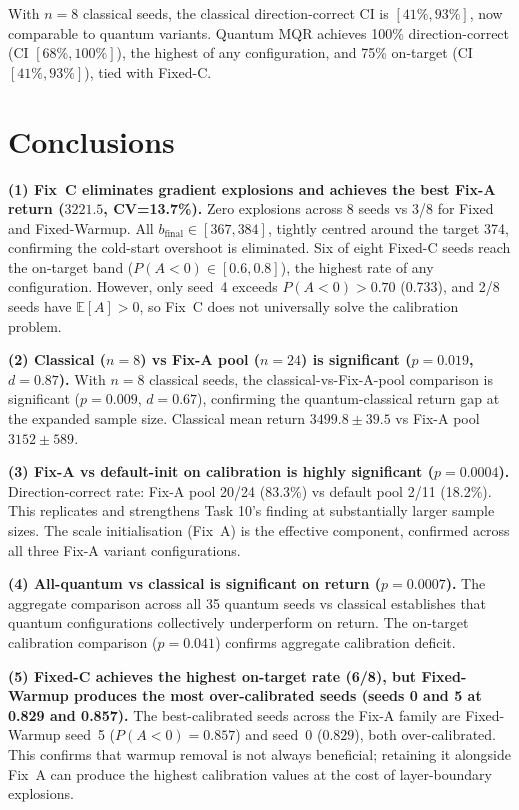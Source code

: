 \documentclass[10pt,a4paper]{article}
\begin{document}
With $n=8$ classical seeds, the classical direction-correct CI is $[41\%,93\%]$,
now comparable to quantum variants. Quantum MQR achieves 100\% direction-correct
(CI $[68\%,100\%]$), the highest of any configuration, and 75\% on-target
(CI $[41\%,93\%]$), tied with Fixed-C.

\section{Conclusions}

\textbf{(1) Fix~C eliminates gradient explosions and achieves the best Fix-A
return ($3221.5$, CV=13.7\%).}
Zero explosions across 8 seeds vs 3/8 for Fixed and Fixed-Warmup. All
$b_\text{final}\in[367,384]$, tightly centred around the target 374, confirming
the cold-start overshoot is eliminated. Six of eight Fixed-C seeds reach the
on-target band ($P(A<0)\in[0.6,0.8]$), the highest rate of any configuration.
However, only seed~4 exceeds $P(A<0)>0.70$ (0.733), and 2/8 seeds have
$\mathbb{E}[A]>0$, so Fix~C does not universally solve the calibration problem.

\textbf{(2) Classical ($n=8$) vs Fix-A pool ($n=24$) is significant ($p=0.019$, $d=0.87$).}
With $n=8$ classical seeds, the classical-vs-Fix-A-pool comparison is significant
($p=0.009$, $d=0.67$), confirming the quantum-classical return gap at the expanded
sample size. Classical mean return $3499.8 \pm 39.5$ vs Fix-A pool $3152 \pm 589$.

\textbf{(3) Fix-A vs default-init on calibration is highly significant ($p=0.0004$).}
Direction-correct rate: Fix-A pool 20/24 (83.3\%) vs default pool 2/11 (18.2\%).
This replicates and strengthens Task 10's finding at substantially larger sample
sizes. The scale initialisation (Fix~A) is the effective component, confirmed
across all three Fix-A variant configurations.

\textbf{(4) All-quantum vs classical is significant on return ($p=0.0007$).}
The aggregate comparison across all 35 quantum seeds vs classical establishes
that quantum configurations collectively underperform on return. The on-target
calibration comparison ($p=0.041$) confirms aggregate calibration deficit.

\textbf{(5) Fixed-C achieves the highest on-target rate (6/8), but Fixed-Warmup
produces the most over-calibrated seeds (seeds 0 and 5 at 0.829 and 0.857).}
The best-calibrated seeds across the Fix-A family are Fixed-Warmup seed~5
($P(A<0)=0.857$) and seed~0 ($0.829$), both over-calibrated. This confirms that
warmup removal is not always beneficial; retaining it alongside Fix~A can
produce the highest calibration values at the cost of layer-boundary explosions.
\end{document}
